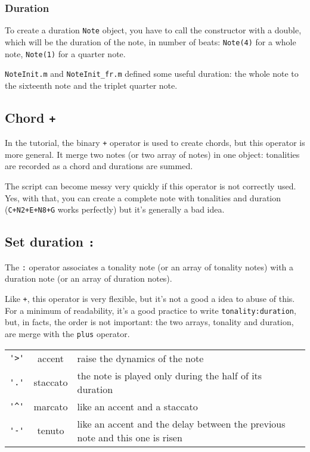 \documentclass{article}
\newcommand\noteInitFile{\texttt{NoteInit.m}\xspace}
\newcommand\noteInitFrFile{\texttt{NoteInit\_fr.m}\xspace}
\begin{document}
\subsubsection{Duration}

To create a duration \lstinline!Note! object, you have to call the constructor with a double, which will be the duration of the note, in number of beats: \lstinline!Note(4)! for a whole note, \lstinline!Note(1)! for a quarter note.

\noteInitFile and \noteInitFrFile defined some useful duration: the whole note to the sixteenth note and the triplet quarter note.

\subsection{Chord \lstinline!+!}

In the tutorial, the binary \lstinline!+! operator is used to create chords, but this operator is more general. It merge two notes (or two array of notes) in one object: tonalities are recorded as a chord and durations are summed.

The script can become messy very quickly if this operator is not correctly used. Yes, with that, you can create a complete note with tonalities and duration (\lstinline!C+N2+E+N8+G! works perfectly) but it's generally a bad idea.

\subsection{Set duration \lstinline!:!}

The \lstinline!:! operator associates a tonality note (or an array of tonality notes) with a duration note (or an array of duration notes).

Like \lstinline!+!, this operator is very flexible, but it's not a good a idea to abuse of this. For a minimum of readability, it's a good practice to write \lstinline!tonality:duration!, but, in facts, the order is not important: the two arrays, tonality and duration, are merge with the \lstinline!plus! operator.

\begin{table}
\begin{tabular}{ccl}
\lstinline!'>'! & accent & raise the dynamics of the note \\
\lstinline!'.'! & staccato & the note is played only during the half of its duration \\
\lstinline!'^'! & marcato & like an accent and a staccato \\
\lstinline!'-'! & tenuto & like an accent and the delay between the previous note and this one is risen \\
\end{tabular}
\end{table}
\end{document}
